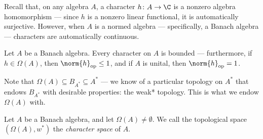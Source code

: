 Recall that, on any algebra $A$, a character $h\colon A\rightarrow \C$ is a nonzero algebra homomorphism --- since $h$ is a nonzero linear functional, it is automatically surjective. However, when $A$ is a normed algebra --- specifically, a Banach algebra --- characters are automatically continuous.
\begin{proposition}
  Let $A$ be a Banach algebra. Every character on $A$ is bounded --- furthermore, if $h\in \Omega\left( A \right)$, then $\norm{h}_{\op}\leq 1$, and if $A$ is unital, then $\norm{h}_{\op} = 1$.
\end{proposition}
Note that $\Omega\left( A \right)\subseteq B_{A^{\ast}}\subseteq A^{\ast}$ --- we know of a particular topology on $A^{\ast}$ that endows $B_{A^{\ast}}$ with desirable properties: the weak* topology. This is what we endow $\Omega(A)$ with.
\begin{definition}
   Let $A$ be a Banach algebra, and let $\Omega\left( A \right)\neq \emptyset$. We call the topological space $\left( \Omega\left( A \right),w^{\ast} \right)$ the \textit{character space} of $A$.
\end{definition}

